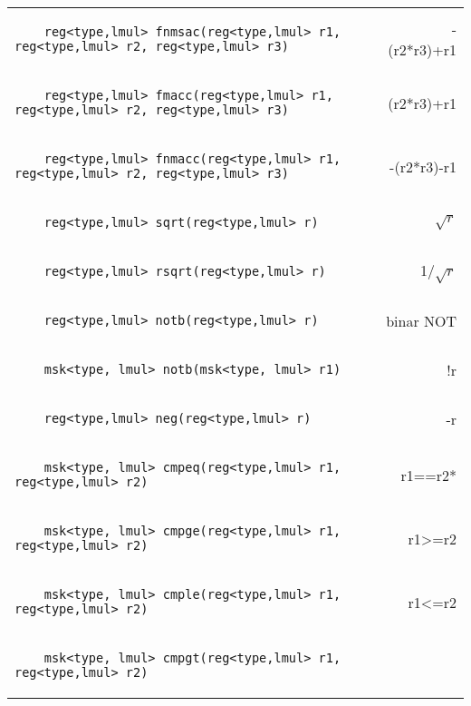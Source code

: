 \begin{center}
\begin{longtable}{l r}
\begin{lstlisting}
    reg<type,lmul> fnmsac(reg<type,lmul> r1, reg<type,lmul> r2, reg<type,lmul> r3)
\end{lstlisting} & -(r2*r3)+r1\\
\begin{lstlisting}
    reg<type,lmul> fmacc(reg<type,lmul> r1, reg<type,lmul> r2, reg<type,lmul> r3)
\end{lstlisting} & (r2*r3)+r1\\
\begin{lstlisting}
    reg<type,lmul> fnmacc(reg<type,lmul> r1, reg<type,lmul> r2, reg<type,lmul> r3)
\end{lstlisting} & -(r2*r3)-r1\\
\begin{lstlisting}
    reg<type,lmul> sqrt(reg<type,lmul> r)
\end{lstlisting} & $\sqrt{r}$\\
\begin{lstlisting}
    reg<type,lmul> rsqrt(reg<type,lmul> r)
\end{lstlisting} & 1/$\sqrt{r}$\\
\begin{lstlisting}
    reg<type,lmul> notb(reg<type,lmul> r)
\end{lstlisting} & binar NOT\\
\begin{lstlisting}
    msk<type, lmul> notb(msk<type, lmul> r1)
\end{lstlisting} & !r\\
\begin{lstlisting}
    reg<type,lmul> neg(reg<type,lmul> r)
\end{lstlisting} & -r\\
\begin{lstlisting}
    msk<type, lmul> cmpeq(reg<type,lmul> r1, reg<type,lmul> r2)
\end{lstlisting} & r1==r2*\\
\begin{lstlisting}
    msk<type, lmul> cmpge(reg<type,lmul> r1, reg<type,lmul> r2)
\end{lstlisting} & r1>=r2\\
\begin{lstlisting}
    msk<type, lmul> cmple(reg<type,lmul> r1, reg<type,lmul> r2)
\end{lstlisting} & r1<=r2\\
\begin{lstlisting}
    msk<type, lmul> cmpgt(reg<type,lmul> r1, reg<type,lmul> r2)

\end{lstlisting}
\end{longtable}
\end{center}

